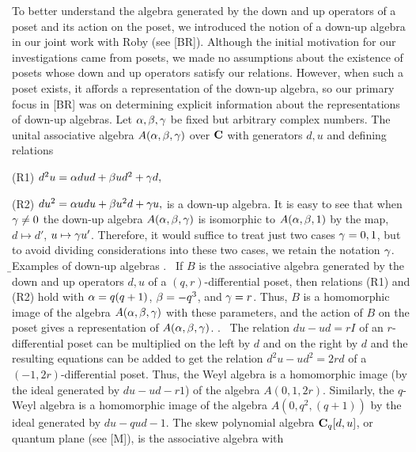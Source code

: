       To better understand the algebra generated by the down and up operators of a
      poset and its action on the poset,  we introduced the notion of
      a down-up algebra in our joint work with Roby (see [BR]).  Although the initial
      motivation for our investigations came from posets, we made no assumptions
      about the existence of posets whose down and up operators satisfy our
      relations.  However, when such a poset exists, it affords a representation
      of the down-up algebra, so our primary focus in [BR]  was on determining
      explicit information about the
      representations of down-up algebras.    
      \m 
       Let $\alpha,\beta,\gamma$ be fixed but arbitrary complex numbers. 
      The unital associative algebra $A(\alpha,\beta,\gamma)$ over ${\text {\bf C}}$ with generators
      $d,u$ and defining relations
      \s
      \item {}{(R1)} $d^2u = \alpha dud + \beta ud^2 + \gamma d,$
      \s 
      \item {}{(R2)} $du^2 = \alpha udu + \beta u^2 d + \gamma u,$ 
      \m
      \n is a down-up algebra. \endproclaim   
      \m
      It is easy to see that when $\gamma \neq 0$ the down-up algebra $A(\alpha,\beta,\gamma)$
      is isomorphic to $A(\alpha,\beta,1)$ by the map, $d \mapsto d'$, $u \mapsto \gamma u'$.
      Therefore, it would suffice to treat just two cases $\gamma = 0,1$, but to
      avoid dividing considerations into these two cases, we retain
      the notation $\gamma$. 
      \b
      \subhead Examples of down-up algebras  \endsubhead
      \m
      . \   If $B$ is the associative algebra generated by the down
      and up operators $d,u$  of
      a $(q,r)$-differential poset,  
      then relations (R1) and (R2) hold with 
      $\alpha = q(q+1)$, $\beta = -q^{3}$, and $\gamma =  r$.  Thus, $B$ is a homomorphic image
      of the algebra $A(\alpha,\beta,\gamma)$ with these parameters, and the action of
      $B$ on the poset gives a representation of $A(\alpha,\beta,\gamma)$. 
      \m 
      . \  The relation $du - ud = rI$ of an $r$-differential poset
      can be multiplied on the left by $d$ and on the right by $d$ and
      the resulting equations can be added to get the relation
      $d^2 u - ud^2 = 2rd$ of a $(-1,2r)$-differential poset.
      Thus, the Weyl algebra is a homomorphic image (by the ideal generated
      by $du-ud - r1$)  of the algebra $A(0,1,2r)$.  
      Similarly, the $q$-Weyl algebra is a homomorphic image of the algebra 
      $A(0,q^2,(q+1))$ by the ideal generated by $du - qud - 1$.  
      The skew polynomial
      algebra ${\text {\bf C}}_q[d,u]$, or quantum plane (see [M]), is the associative algebra with
